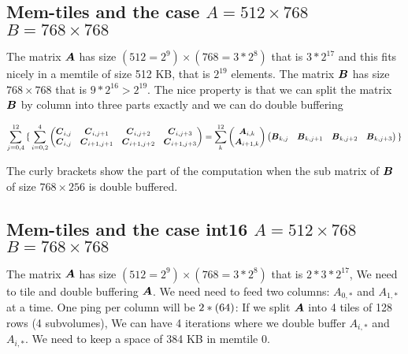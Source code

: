 \documentclass[journal]{IEEEtran}
\begin{document}
\subsection{Mem-tiles and the case   $A=512\times 768$ $B=768\times 768$ }

The matrix ${\boldsymbol A}$ has size $(512=2^9) \times (768= 3*2^8)$ that is
$3*2^{17}$ and this fits nicely in a memtile of size 512 KB, that is
$2^{19}$ elements.  The matrix ${\boldsymbol B}$ has size $768 \times 768$ that
is $9*2^{16}>2^{19}$. The nice property is that we can split the
matrix ${\boldsymbol B}$ by column into three parts exactly and we can do
double buffering


{\small \begin{equation*}
    \sum_{j=0,4}^{12}
    { \{ } \sum_{i=0,2}^4
  \begin{pmatrix}
    {\boldsymbol C}_{i,j}  & {\boldsymbol C}_{i,j+1}    & {\boldsymbol C}_{i,j+2}    &{\boldsymbol C}_{i,j+3} \\
    {\boldsymbol C}_{i,j}  & {\boldsymbol C}_{i+1,j+1}   & {\boldsymbol C}_{i+1,j+2}  & {\boldsymbol C}_{i+1,j+3} \\
  \end{pmatrix}    = \sum_k^{12}
  \begin{pmatrix}
    {\boldsymbol A}_{i,k}  \\
    {\boldsymbol A}_{i+1,k}   \\
  \end{pmatrix}  
  \begin{pmatrix}
    {\boldsymbol B}_{k,j}  &  {\boldsymbol B}_{k,j+1}  & {\boldsymbol B}_{k,j+2}  &{\boldsymbol B}_{k,j+3} \\
  \end{pmatrix}
  { \}}    
\end{equation*}
}

The curly brackets show the part of the computation when the sub
matrix of ${\boldsymbol B}$ of size $768 \times 256$ is double buffered.

\subsection{Mem-tiles and the case  int16  $A=512\times 768$ $B=768\times 768$ }

The matrix ${\boldsymbol A}$ has size $(512=2^9) \times (768= 3*2^8)$ that is
$2*3*2^{17}$, We need to tile and double buffering ${\boldsymbol A}$.  We need
need to feed two columns: $A_{0,*}$ and $A_{1,*}$ at a time. One ping
per column will be $2*(64 \time 768)$: If we split ${\boldsymbol A}$ into 4
tiles of 128 rows (4 subvolumes), We can have 4 iterations where we
double buffer $A_{i,*}$ and $A_{i,*}$. We need to keep a space of 384
KB in memtile 0.
\end{document}
